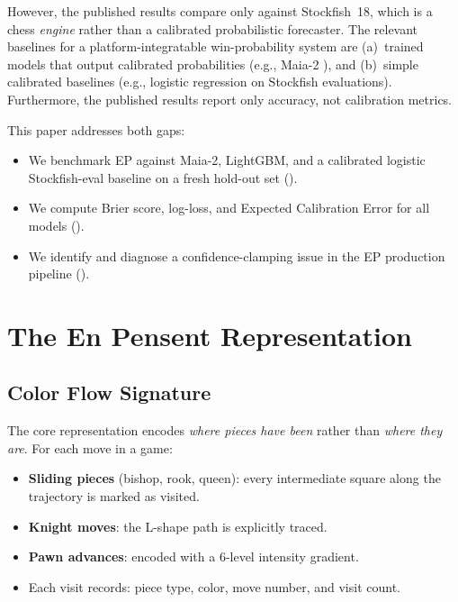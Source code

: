 \documentclass[11pt,a4paper]{article}
\begin{document}
However, the published results compare only against Stockfish~18, which is
a chess \emph{engine} rather than a calibrated probabilistic forecaster.
The relevant baselines for a platform-integratable win-probability system
are (a)~trained models that output calibrated probabilities (e.g., Maia-2
\cite{tang2024maia}), and (b)~simple calibrated baselines (e.g., logistic
regression on Stockfish evaluations). Furthermore, the published results
report only accuracy, not calibration metrics.

This paper addresses both gaps:
\begin{itemize}[nosep]
  \item We benchmark EP against Maia-2, LightGBM, and a calibrated
        logistic Stockfish-eval baseline on a fresh hold-out set
        ().
  \item We compute Brier score, log-loss, and Expected Calibration Error
        for all models ().
  \item We identify and diagnose a confidence-clamping issue in the EP
        production pipeline ().
\end{itemize}

\section{The En Pensent Representation}
\label{sec:method}

\subsection{Color Flow Signature}

The core representation encodes \emph{where pieces have been} rather than
\emph{where they are}. For each move in a game:

\begin{itemize}[nosep]
  \item \textbf{Sliding pieces} (bishop, rook, queen): every intermediate
        square along the trajectory is marked as visited.
  \item \textbf{Knight moves}: the L-shape path is explicitly traced.
  \item \textbf{Pawn advances}: encoded with a 6-level intensity gradient.
  \item Each visit records: piece type, color, move number, and visit count.
\end{itemize}
\end{document}
